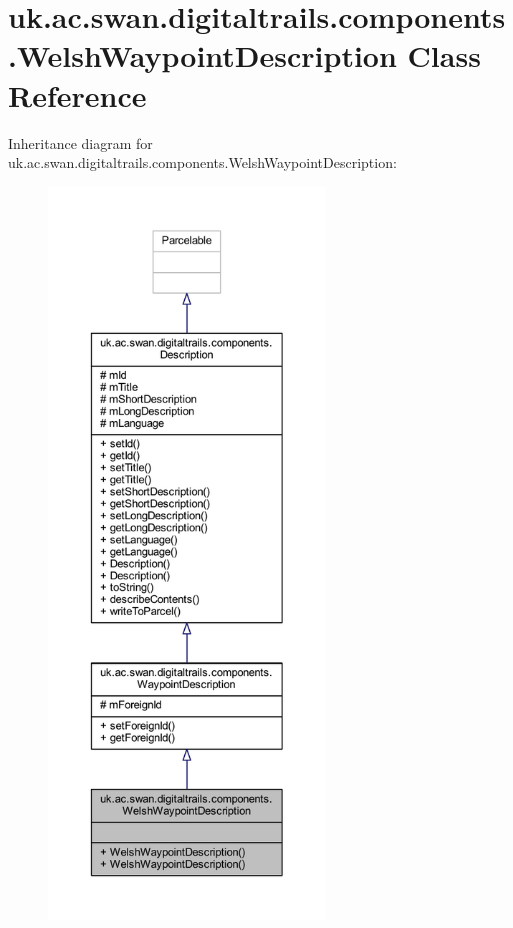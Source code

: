 \hypertarget{classuk_1_1ac_1_1swan_1_1digitaltrails_1_1components_1_1_welsh_waypoint_description}{\section{uk.\+ac.\+swan.\+digitaltrails.\+components.\+Welsh\+Waypoint\+Description Class Reference}
\label{classuk_1_1ac_1_1swan_1_1digitaltrails_1_1components_1_1_welsh_waypoint_description}
}


Inheritance diagram for uk.\+ac.\+swan.\+digitaltrails.\+components.\+Welsh\+Waypoint\+Description\+:
\nopagebreak
\begin{figure}[H]
\begin{center}
\leavevmode
\includegraphics[height=550pt]{classuk_1_1ac_1_1swan_1_1digitaltrails_1_1components_1_1_welsh_waypoint_description__inherit__graph}
\end{center}
\end{figure}


